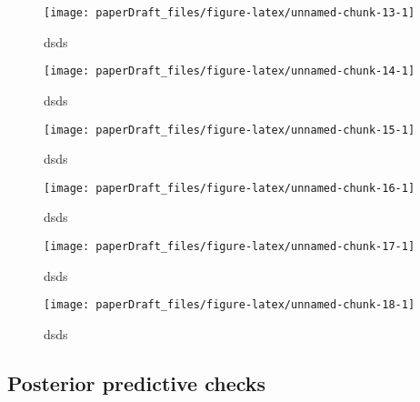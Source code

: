 \documentclass[
  10pt,
  dvipsnames,enabledeprecatedfontcommands]{scrartcl}
\begin{document}
\begin{figure}[H]


\begin{center}\texttt{[image: paperDraft\_files/figure-latex/unnamed-chunk-13-1]} \end{center}
\caption{dsds}
\label{fig:genderGoogle}
\end{figure}

\begin{figure}[H]

\begin{center}\texttt{[image: paperDraft\_files/figure-latex/unnamed-chunk-14-1]} \end{center}
\caption{dsds}
\label{fig:genderGlove}
\end{figure}

\begin{figure}[H]

\begin{center}\texttt{[image: paperDraft\_files/figure-latex/unnamed-chunk-15-1]} \end{center}
\caption{dsds}
\label{fig:genderReddit}
\end{figure}

\begin{figure}[H]

\begin{center}\texttt{[image: paperDraft\_files/figure-latex/unnamed-chunk-16-1]} \end{center}
\caption{dsds}
\label{fig:debiasedReligion}
\end{figure}

\begin{figure}[H]

\begin{center}\texttt{[image: paperDraft\_files/figure-latex/unnamed-chunk-17-1]} \end{center}
\caption{dsds}
\label{fig:debiasedRace}
\end{figure}

\begin{figure}[H]

\begin{center}\texttt{[image: paperDraft\_files/figure-latex/unnamed-chunk-18-1]} \end{center}
\caption{dsds}
\label{fig:debiasedGender}
\end{figure}

\hypertarget{posterior-predictive-checks}{%
\subsection{Posterior predictive
checks}\label{posterior-predictive-checks}}
\end{document}

